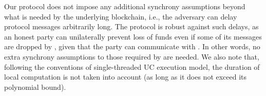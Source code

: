   Our protocol does not impose any additional synchrony assumptions beyond what
  is needed by the underlying blockchain, i.e., the adversary can delay protocol
  messages arbitrarily long. The protocol is robust against such delays, as an
  honest party can unilaterally prevent loss of funds even if some of its
  messages are dropped by \adversary, given that
  the party can communicate with \ledger. In other words, no
  extra synchrony assumptions to those required by \ledger are needed. We
  also note that,
  following the conventions of single-threaded UC execution model, the duration of local
  computation is not taken into account (as long as it does not
  exceed its polynomial bound).
